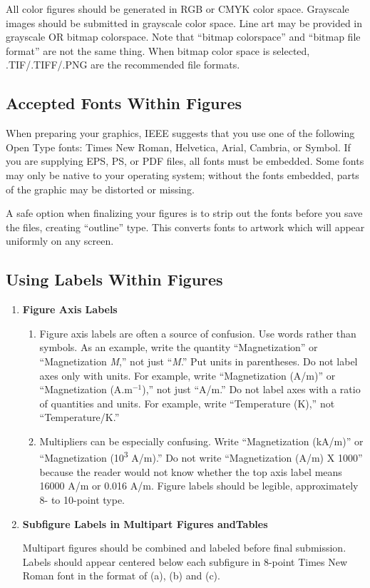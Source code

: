 \documentclass[correspondence]{IEEEtaes}
\begin{document}
All color figures should be generated in RGB or CMYK color space. Grayscale images should be submitted in grayscale color space. Line art may be provided in grayscale OR bitmap colorspace. Note that ``bitmap colorspace'' and ``bitmap file format'' are not the same thing. When bitmap color space is selected, .TIF/.TIFF/.PNG are the recommended file formats.

\subsection{Accepted Fonts Within Figures}

When preparing your graphics, IEEE suggests that you use one of the
following Open Type fonts: Times New Roman, Helvetica, Arial, Cambria,
or Symbol. If you are supplying EPS, PS, or PDF files, all fonts must be
embedded. Some fonts may only be native to your operating system;
without the fonts embedded, parts of the graphic may be distorted or
missing.

A safe option when finalizing your figures is to strip out the fonts
before you save the files, creating ``outline'' type. This converts
fonts to artwork which will appear uniformly on any screen.

\subsection{Using Labels Within Figures}

\begin{enumerate}
\def\labelenumi{\arabic{enumi})}
\item
  \textbf{Figure Axis Labels}

  \begin{enumerate}
  \def\labelenumii{\alph{enumii})}
  \item
    Figure axis labels are often a source of confusion. Use words rather
    than symbols. As an example, write the quantity ``Magnetization'' or
    ``Magnetization \emph{M},'' not just ``\emph{M}.'' Put units in
    parentheses. Do not label axes only with units. For example, write
    ``Magnetization (A/m)'' or ``Magnetization
    (A.m$^{{-}1}$),'' not just ``A/m.'' Do not label axes with
    a ratio of quantities and units. For example, write ``Temperature
    (K),'' not ``Temperature/K.''
  \item
    Multipliers can be especially confusing. Write ``Magnetization
    (kA/m)'' or ``Magnetization (10\textsuperscript{3} A/m).'' Do not
    write ``Magnetization (A/m) X 1000'' because the reader would not
    know whether the top axis label means 16000 A/m or 0.016 A/m. Figure
    labels should be legible, approximately 8- to 10-point type.
  \end{enumerate}
\item
  \textbf{Subfigure Labels in Multipart Figures and\break Tables}

  Multipart figures should be combined and labeled before final submission. Labels should appear centered below each subfigure in 8-point Times New Roman font in the format of (a), (b) and (c).
\end{enumerate}
\end{document}
